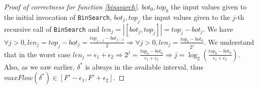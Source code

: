 \documentclass[11pt]{article}
\theoremstyle{definition}
\theoremstyle{corollary}
\theoremstyle{lemma}
\begin{document}
\begin{proof}[Proof of correctness for function \ref{binsearch}]
       $bot_0, top_0$ the input values given to the initial invocation of \texttt{BinSearch}, $bot_j,top_j$ the input
       values given to the $j$-th recursive call of \texttt{BinSearch} and $len_j =|[bot_j, top_j]| = top_j - bot_j$. We have
       $\forall j > 0, len_j = top_j - bot_j = \frac{top_{j-1} - bot_{j-1}}{2} \Rightarrow \forall j >0, len_j =
       \frac{top_0 - bot_0}{2^j}$. We understand that in the worst case $len_j = \epsilon_1 + \epsilon_2 \Rightarrow
       2^j = \frac{top_0-bot_0}{\epsilon_1 + \epsilon_2} \Rightarrow j = \log_2(\frac{top_0-bot_0}{\epsilon_1+\epsilon_2})$.
       Also, as we saw earlier, $\delta^*$ is always in the available interval, thus $maxFlow(\delta^*) \in [F' - \epsilon_1,
       F' + \epsilon_2]$.
    \end{proof}
\end{document}
